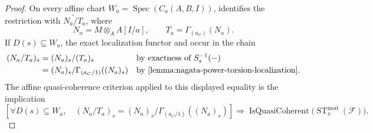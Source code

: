 \begin{proof}
  On every affine chart $W_a=\operatorname{Spec}(C_a(A,B,I))$,
   identifies the
  restriction with $\widetilde{N_a/T_a}$, where
  \[
    N_a=M\otimes_AA[I/a],
    \qquad T_a=\Gamma_{(a_C)}(N_a).
  \]
  If $D(s)\subseteq W_a$, the exact localization functor and
   occur in the chain
  \[
  \begin{aligned}
    (N_a/T_a)_s
      &= (N_a)_s/(T_a)_s
         &&\text{by exactness of }S_s^{-1}(-)\\
      &= (N_a)_s/\Gamma_{(a_C/1)}((N_a)_s)
         &&\text{by \Cref{lemma:nagata-power-torsion-localization}}.
  \end{aligned}
  \]
  The affine quasi-coherence criterion applied to this displayed equality is
  the implication
  \[
    \left[
      \forall D(s)\subseteq W_a,\quad
      (N_a/T_a)_s=(N_a)_s/\Gamma_{(a_C/1)}((N_a)_s)
    \right]
    \Longrightarrow
    \operatorname{IsQuasiCoherent}
      \bigl(\operatorname{ST}^{\mathrm{mod}}_\pi(\mathcal F)\bigr).
  \]
\end{proof}

